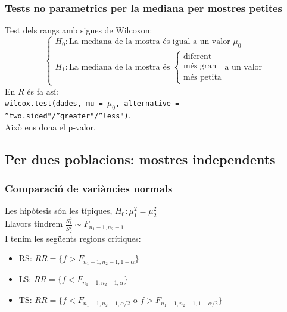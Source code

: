 \documentclass[a4paper]{sciposter}
\begin{document}
\begin{multicols}{3}
\subsubsection{Tests no parametrics per la mediana per mostres petites}
Test dels rangs amb signes de Wilcoxon:\\
\begin{displaymath}
	\begin{cases}
		H_0: \text{La mediana de la mostra és igual a un valor } \mu_0\\
		H_1: \text{La mediana de la mostra és } \begin{cases}\text{diferent}\\\text{més gran}\\\text{més petita}\end{cases} \text{a un valor}
	\end{cases}
\end{displaymath}
En $R$ és fa así: \\\texttt{wilcox.test(dades, mu = $\mu_0$, alternative = ''two.sided"/''greater"/''less")}.\\Això ens dona el p-valor.
\subsection{Per dues poblacions: mostres independents}
\subsubsection{Comparació de variàncies normals}
Les hipòtesis són les típiques, $H_0: \mu^2_1 = \mu^2_2$\\
Llavors tindrem $\frac{S_1^2}{S_2^2} \sim F_{n_1-1,n_2-1}$\\
I tenim les següents regions crítiques:
\begin{itemize}
	\item RS: $RR = \{f > F_{n_1-1,n_2-1,1-\alpha}\}$
	\item LS: $RR = \{f < F_{n_1-1,n_2-1,\alpha}\}$
	\item TS: $RR = \{f < F_{n_1-1,n_2-1,\alpha/2} \text{ o } f > F_{n_1-1,n_2-1,1-\alpha/2}\}$
\end{itemize}

\end{multicols}
\end{document}
